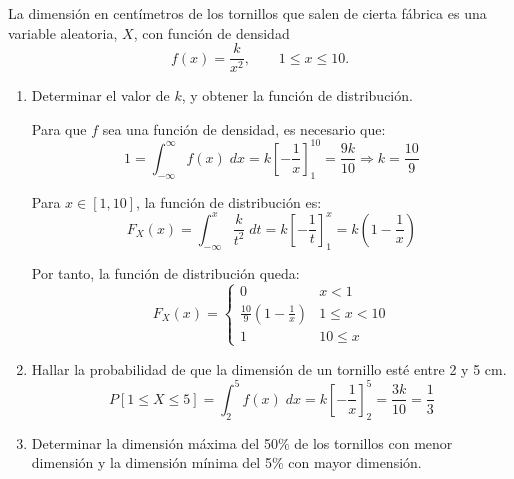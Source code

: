 \begin{ejercicio}
    La dimensión en centímetros de los tornillos que salen de cierta fábrica es una variable aleatoria, $X$, con función de densidad
    \begin{equation*}
        f(x)=\frac{k}{x^2},\qquad 1\leq x \leq 10.
    \end{equation*}


    \begin{enumerate}
        \item Determinar el valor de $k$, y obtener la función de distribución.

        Para que $f$ sea una función de densidad, es necesario que:
        \begin{equation*}
            1=\int_{-\infty}^{\infty}f(x)\;dx = k\left[-\frac{1}{x}\right]_1^{10} = \frac{9k}{10} \Longrightarrow k=\frac{10}{9}
        \end{equation*}

        Para $x\in [1,10]$, la función de distribución es:
        \begin{equation*}
            F_X(x) = \int_{-\infty}^x \frac{k}{t^2}\;dt
            = k\left[-\frac{1}{t}\right]_1^{x}
            = k\left(1-\frac{1}{x}\right)
        \end{equation*}

        Por tanto, la función de distribución queda:
        \begin{equation*}
            F_X(x) = \left\{\begin{array}{cc}
                0 & x<1 \\
                \frac{10}{9}\left(1-\frac{1}{x}\right) & 1 \leq x < 10 \\
                1 & 10\leq x
            \end{array}\right.
        \end{equation*}

        \item Hallar la probabilidad de que la dimensión de un tornillo esté entre 2 y 5 cm.
        \begin{equation*}
            P[1\leq X \leq 5] = \int_2^5 f(x)\;dx = k\left[-\frac{1}{x}\right]_2^5 = \frac{3k}{10} = \frac{1}{3}
        \end{equation*}

        \item Determinar la dimensión máxima del 50\% de los tornillos con menor dimensión y la dimensión mínima del 5\% con mayor dimensión.


\end{enumerate}
\end{ejercicio}
